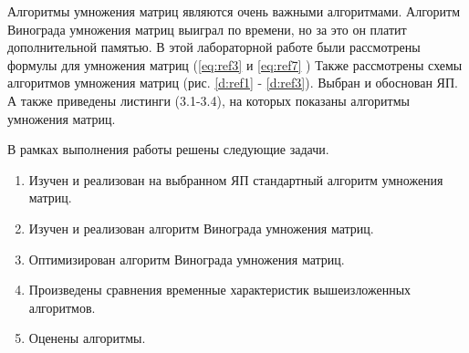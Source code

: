 \Conclusion %

Алгоритмы умножения матриц являют­ся очень важными алгоритмами.
Алгоритм Винограда умножения матриц выиграл по времени, но  
за это он платит дополнительной памятью.
В этой лабораторной работе были рассмотрены формулы для умножения матриц (\ref{eq:ref3} и  \ref{eq:ref7} )
Также рассмотрены схемы алгоритмов умножения матриц (рис. \ref{d:ref1} - \ref{d:ref3}). 
Выбран и обоснован ЯП. 
А также приведены листинги (3.1-3.4), на которых показаны алгоритмы умножения матриц.


В рамках выполнения работы решены следующие задачи.

\begin{enumerate}
	\item Изучен и реализован на выбранном ЯП стандартный алгоритм умножения матриц.
	\item Изучен и реализован алгоритм Винограда умножения матриц.
	\item Оптимизирован алгоритм Винограда умножения матриц.
	\item Произведены сравнения временные характеристик вышеизложенных алгоритмов.
	\item Оценены алгоритмы.
\end{enumerate}
